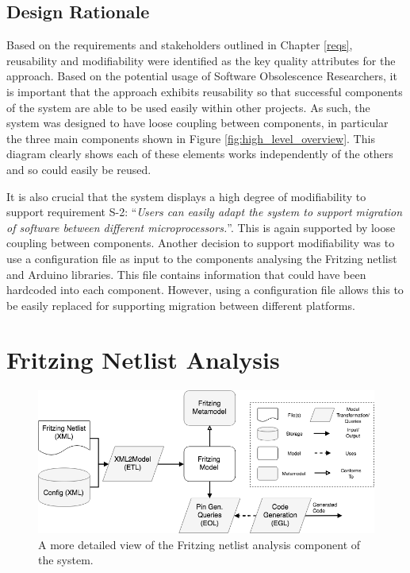 \documentclass{UoYCSproject}
\begin{document}
\subsection{Design Rationale}
Based on the requirements and stakeholders outlined in Chapter \ref{reqs}, reusability and modifiability were identified as the key quality attributes for the approach. Based on the potential usage of Software Obsolescence Researchers, it is important that the approach exhibits reusability so that successful components of the system are able to be used easily within other projects. As such, the system was designed to have loose coupling between components, in particular the three main components shown in Figure \ref{fig:high_level_overview}. This diagram clearly shows each of these elements works independently of the others and so could easily be reused. 

It is also crucial that the system displays a high degree of modifiability to support requirement S-2: ``\textit{Users can easily adapt the system to support migration of software between different microprocessors.}''. This is again supported by loose coupling between components. Another decision to support modifiability was to use a configuration file as input to the components analysing the Fritzing netlist and Arduino libraries. This file contains information that could have been hardcoded into each component. However, using a configuration file allows this to be easily replaced for supporting migration between different platforms.

\section{Fritzing Netlist Analysis} \label{fritz_design}
\begin{figure}[h!]
  \centering
  \includegraphics[width=0.8\linewidth]{graphics/fritzing_analysis.png}
  \caption{A more detailed view of the Fritzing netlist analysis component of the system.}
  \label{fig:fritzing_analysis}
\end{figure}
\end{document}
